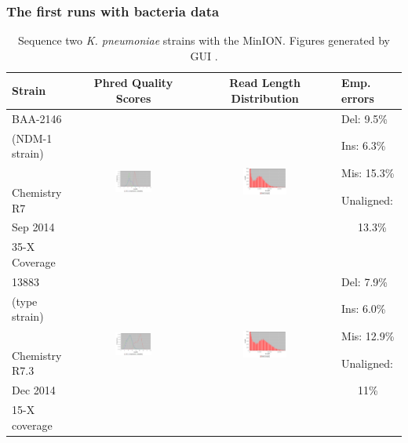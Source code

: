 \subsubsection{The first runs with bacteria data} 

\begin{table}[ht!]
\centering
\small
\caption[Sequence two \emph{K. pneumoniae} strains with the MinION]{Sequence two \emph{K. pneumoniae} strains with the MinION. Figures generated by \npreader{} GUI \cite{CaoGC2016}.} 
\label{tab:first}
 \begin{tabular}{lccl}
 \hline
 Strain & Phred Quality Scores & Read Length Distribution & Emp. errors \\
 \hline
   BAA-2146 & & & Del: 9.5\% \\ 
   (NDM-1 strain)& \multirow{4}{*}{\includegraphics[width=0.33\textwidth]{images/qualR7.png}}    & \multirow{4}{*}{\includegraphics[width=0.33\textwidth]{images/lengthR7.png}} &  Ins: 6.3\% \\
    & & & Mis: 15.3\% \\    
   Chemistry R7& & &  Unaligned:  \\
   Sep 2014& & & \ \ \  13.3\% \\
   35-X Coverage& & & \\ \hline  
   
   13883 & & &  Del: 7.9\% \\   
   (type strain)& \multirow{4}{*}{\includegraphics[width=0.33\textwidth]{images/qualR73.png}} & \multirow{4}{*}{\includegraphics[width=0.33\textwidth]{images/lengthR73.png}} & Ins: 6.0\% \\
   & & & Mis: 12.9\% \\   
   Chemistry R7.3 & & & Unaligned:  \\   
   Dec 2014 & & & \ \ \ 11\%\\
   15-X coverage & & & \\ \hline
 \end{tabular} 
\end{table}

